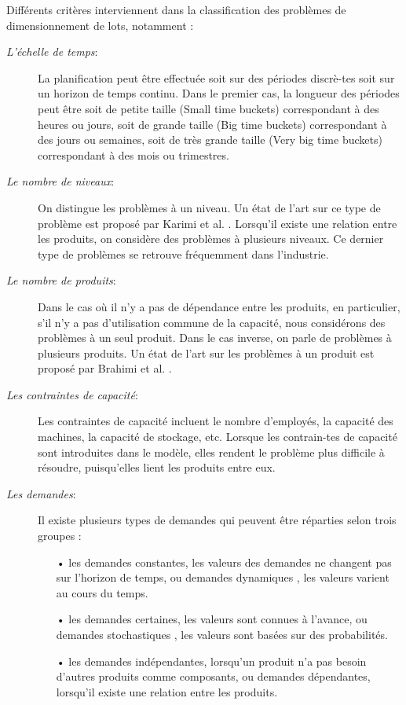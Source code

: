 \documentclass[12pt,a4paper]{article}
\begin{document}
Différents critères interviennent dans la classification des problèmes de dimensionnement de lots, notamment : 
\begin{description}
	\item[\textsl{L'échelle de temps}:] La planification peut être effectuée soit sur des périodes discrè-tes soit sur un horizon de temps continu. Dans le premier cas, la longueur des périodes peut
être soit de petite taille (Small time buckets) correspondant à des heures ou jours, soit de grande taille (Big time buckets) correspondant à des jours ou semaines, soit de très grande taille (Very big time buckets) correspondant à des mois ou trimestres.

	\item[\textsl{Le nombre de niveaux}:] On distingue les problèmes à un niveau. Un état de l'art sur ce type de problème est proposé par Karimi et al. \cite{karimi} . Lorsqu'il existe une relation entre les produits, on considère des problèmes à plusieurs niveaux. Ce dernier type de problèmes se retrouve fréquemment dans l'industrie.

	\item[\textsl{Le nombre de produits}:] Dans le cas où il n'y a pas de dépendance entre les produits, en particulier, s'il n'y a pas d'utilisation commune de la capacité, nous considérons des problèmes à un seul produit. Dans le cas inverse, on parle de problèmes à plusieurs produits. Un état de l'art sur les problèmes à un produit est proposé par Brahimi et al. \cite{brahimi}.

	\item[\textsl{Les contraintes de capacité}:] Les contraintes de capacité incluent le nombre d'employés, la capacité des machines, la capacité de stockage, etc. Lorsque les contrain-tes de capacité sont
introduites dans le modèle, elles rendent le problème plus difficile à résoudre,
puisqu'elles lient les produits entre eux.

	\item[\textsl{Les demandes}:] Il existe plusieurs types de demandes qui peuvent être réparties selon trois
groupes :
	\begin{itemize}
		\item[•] les demandes constantes, les valeurs des demandes ne changent pas sur l'horizon de temps, ou demandes dynamiques , les valeurs varient au cours du temps.
		\item[•] les demandes certaines, les valeurs sont connues à l'avance, ou demandes stochastiques , les valeurs sont basées sur des probabilités.
		\item[•] les demandes indépendantes, lorsqu'un produit n'a pas besoin d'autres produits comme composants, ou demandes dépendantes, lorsqu'il existe une relation entre les produits.
	\end{itemize}


\end{description}
\end{document}
